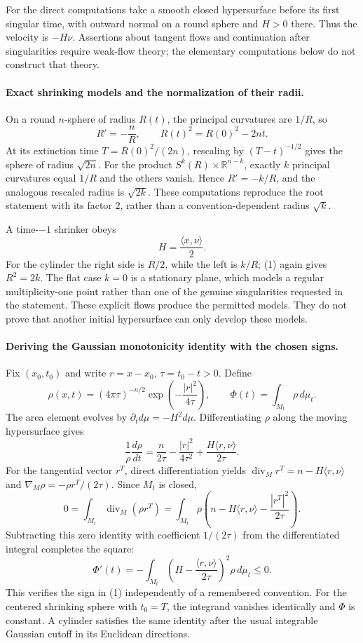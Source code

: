 \documentclass[11pt]{article}
\begin{document}
For the direct computations take a smooth closed hypersurface before
its first singular time, with outward normal on a round sphere and
$H>0$ there. Thus the velocity is $-H\nu$. Assertions about tangent
flows and continuation after singularities require weak-flow theory;
the elementary computations below do not construct that theory.

\paragraph{Exact shrinking models and the normalization of their radii.}
On a round $n$-sphere of radius $R(t)$, the principal curvatures are
$1/R$, so
\[
             R'=-\frac nR,\qquad R(t)^2=R(0)^2-2nt.
\]
At its extinction time $T=R(0)^2/(2n)$, rescaling by
$(T-t)^{-1/2}$ gives the sphere of radius $\sqrt{2n}$. For the product
$S^k(R)\times\mathbb R^{n-k}$, exactly $k$ principal curvatures equal
$1/R$ and the others vanish. Hence $R'=-k/R$, and the analogous
rescaled radius is $\sqrt{2k}$. These computations reproduce the root
statement with its factor $2$, rather than a convention-dependent
radius $\sqrt{k}$.

A time-$-1$ shrinker obeys
\[
                       H=\frac{\langle x,\nu\rangle}{2}.       \tag{1}
\]
For the cylinder the right side is $R/2$, while the left is $k/R$;
(1) again gives $R^2=2k$. The flat case $k=0$ is a stationary plane,
which models a regular multiplicity-one point rather than one of the
genuine singularities requested in the statement. These explicit
flows produce the permitted models. They do not prove that another
initial hypersurface can only develop these models.

\paragraph{Deriving the Gaussian monotonicity identity with the chosen signs.}
Fix $(x_0,t_0)$ and write $r=x-x_0$, $\tau=t_0-t>0$. Define
\[
 \rho(x,t)=(4\pi\tau)^{-n/2}\exp\left(-\frac{|r|^2}{4\tau}\right),
 \qquad \Phi(t)=\int_{M_t}\rho\,d\mu_t.
\]
The area element evolves by $\partial_t d\mu=-H^2d\mu$.
Differentiating $\rho$ along the moving hypersurface gives
\[
 \frac{1}{\rho}\frac{d\rho}{dt}
 =\frac n{2\tau}-\frac{|r|^2}{4\tau^2}
       +\frac{H\langle r,\nu\rangle}{2\tau}.
\]
For the tangential vector $r^T$, direct differentiation yields
$\operatorname{div}_M r^T=n-H\langle r,\nu\rangle$ and
$\nabla_M\rho=-\rho r^T/(2\tau)$. Since $M_t$ is closed,
\[
 0=\int_{M_t}\operatorname{div}_M(\rho r^T)
  =\int_{M_t}\rho\left(n-H\langle r,\nu\rangle
                         -\frac{|r^T|^2}{2\tau}\right).
\]
Subtracting this zero identity with coefficient $1/(2\tau)$ from the
differentiated integral completes the square:
\[
 \Phi'(t)=-\int_{M_t}
       \left(H-\frac{\langle r,\nu\rangle}{2\tau}\right)^2
            \rho\,d\mu_t\leq0.                              \tag{2}
\]
This verifies the sign in (1) independently of a remembered convention.
For the centered shrinking sphere with $t_0=T$, the integrand vanishes
identically and $\Phi$ is constant. A cylinder satisfies the same
identity after the usual integrable Gaussian cutoff in its Euclidean
directions.
\end{document}
